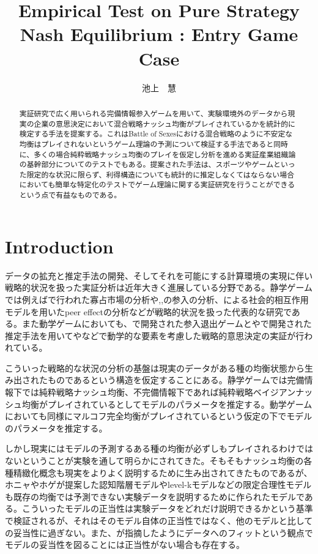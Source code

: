 \documentclass{jsarticle}
\begin{document}
\title{Empirical Test on Pure Strategy Nash Equilibrium : Entry Game Case}
\author{池上　慧}
\maketitle

\begin{abstract}
	実証研究で広く用いられる完備情報参入ゲームを用いて、実験環境外のデータから現実の企業の意思決定において混合戦略ナッシュ均衡がプレイされているかを統計的に検定する手法を提案する。これはBattle of Sexesにおける混合戦略のように不安定な均衡はプレイされないというゲーム理論の予測について検証する手法であると同時に、多くの場合純粋戦略ナッシュ均衡のプレイを仮定し分析を進める実証産業組織論の基幹部分についてのテストでもある。提案された手法は、スポーツやゲームといった限定的な状況に限らず、利得構造についても統計的に推定しなくてはならない場合においても簡単な特定化のテストでゲーム理論に関する実証研究を行うことができるという点で有益なものである。
\end{abstract}

\section{Introduction}
データの拡充と推定手法の開発、そしてそれを可能にする計算環境の実現に伴い戦略的状況を扱った実証分析は近年大きく進展している分野である。静学ゲームでは例えば\cite{Publishing2010}で行われた寡占市場の分析や\cite{Bresnahan1991},\cite{Tamer2003a},\cite{Seim2006}の参入の分析、\cite{Brock2001a}による社会的相互作用モデルを用いたpeer effectの分析などが戦略的状況を扱った代表的な研究である。また動学ゲームにおいても、\cite{Pakes1994}で開発された参入退出ゲームと\cite{Aguirregabiria2007}や\cite{Bajari2007}で開発された推定手法を用いて\cite{Exler2013}や\cite{Ryan2012}などで動学的な要素を考慮した戦略的意思決定の実証が行われている。

こういった戦略的な状況の分析の基盤は現実のデータがある種の均衡状態から生み出されたものであるという構造を仮定することにある。静学ゲームでは完備情報下では純粋戦略ナッシュ均衡、不完備情報下であれば純粋戦略ベイジアンナッシュ均衡がプレイされているとしてモデルのパラメータを推定する。動学ゲームにおいても同様にマルコフ完全均衡がプレイされているという仮定の下でモデルのパラメータを推定する。

しかし現実にはモデルの予測するある種の均衡が必ずしもプレイされるわけではないということが実験を通して明らかにされてきた。そもそもナッシュ均衡の各種精緻化概念も現実をよりよく説明するために生み出されてきたものであるが、ホニャやホゲが提案した認知階層モデルやlevel-kモデルなどの限定合理性モデルも既存の均衡では予測できない実験データを説明するために作られたモデルである。こういったモデルの正当性は実験データをどれだけ説明できるかという基準で検証されるが、それはそのモデル自体の正当性ではなく、他のモデルと比しての妥当性に過ぎない。また、\cite{Haile2016}が指摘したようにデータへのフィットという観点でモデルの妥当性を図ることには正当性がない場合も存在する。
\end{document}
